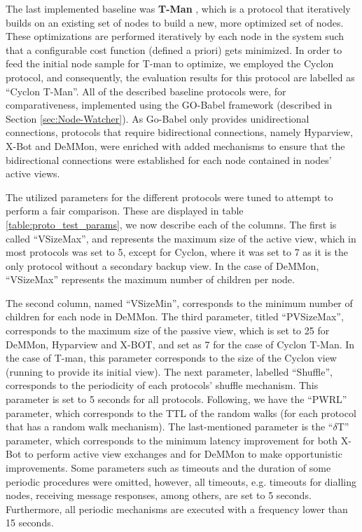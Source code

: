 The last implemented baseline was \textbf{T-Man} \cite{t-man}, which is a protocol that iteratively builds on an existing set of nodes to build a new, more optimized set of nodes. These optimizations are performed iteratively by each node in the system such that a configurable cost function (defined a priori) gets minimized. In order to feed the initial node sample for T-man to optimize, we employed the Cyclon protocol, and consequently, the evaluation results for this protocol are labelled as ``Cyclon T-Man''. All of the described baseline protocols were, for comparativeness, implemented using the GO-Babel framework (described in Section \ref{sec:Node-Watcher}). As Go-Babel only provides unidirectional connections, protocols that require bidirectional connections, namely Hyparview, X-Bot and DeMMon, were enriched with added mechanisms to ensure that the bidirectional connections were established for each node contained in nodes' active views.

The utilized parameters for the different protocols were tuned to attempt to perform a fair comparison. These are displayed in table \ref{table:proto_test_params}, we now describe each of the columns. The first is called ``VSizeMax'', and represents the maximum size of the active view, which in most protocols was set to 5, except for Cyclon, where it was set to 7 as it is the only protocol without a secondary backup view. In the case of DeMMon, ``VSizeMax'' represents the maximum number of children per node. 

The second column, named ``VSizeMin'', corresponds to the minimum number of children for each node in DeMMon. The third parameter, titled ``PVSizeMax'', corresponds to the maximum size of the passive view, which is set to 25 for DeMMon, Hyparview and X-BOT, and set as 7 for the case of Cyclon T-Man. In the case of T-man, this parameter corresponds to the size of the Cyclon view (running to provide its initial view). The next parameter, labelled ``Shuffle'', corresponds to the periodicity of each protocols' shuffle mechanism. This parameter is set to 5 seconds for all protocols. Following, we have the ``PWRL'' parameter, which corresponds to the TTL of the random walks (for each protocol that has a random walk mechanism). The last-mentioned parameter is the ``$\delta$T'' parameter, which corresponds to the minimum latency improvement for both X-Bot to perform active view exchanges and for DeMMon to make opportunistic improvements. Some parameters such as timeouts and the duration of some periodic procedures were omitted, however, all timeouts, e.g. timeouts for dialling nodes, receiving message responses, among others, are set to 5 seconds. Furthermore, all periodic mechanisms are executed with a frequency lower than 15 seconds.

